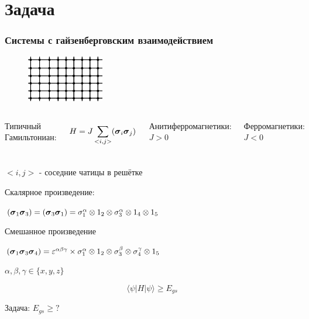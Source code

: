 \documentclass{beamer}
\begin{document}
\section{Задача}
\begin{frame}
\frametitle{Системы с гайзенберговским взаимодействием}
\begin{figure}
\includegraphics[width=0.3\textwidth]{lattice.png}
\end{figure}

\begin{columns}[c] %
\begin{center}Типичный Гамильтониан:\end{center}
$$H=J\sum_{<i,j>}({\boldsymbol{\sigma}}_i {\boldsymbol{\sigma}}_j)$$

Анитиферромагнетики: $J>0$

Ферромагнетики: $J<0$

\end{columns}
$<i,j>$ - соседние чатицы в решётке

Скалярное произведение: 

$({\boldsymbol{\sigma}}_1{\boldsymbol{\sigma}}_3) = ({\boldsymbol{\sigma}}_3{\boldsymbol{\sigma}}_1) = \sigma_1^\alpha\otimes 1_2\otimes\sigma_3^\alpha \otimes 1_4 \otimes 1_5 $%

Смешанное произведение 

$({\boldsymbol{\sigma}}_1{\boldsymbol{\sigma}}_3{\boldsymbol{\sigma}}_4) = 
\varepsilon^{\alpha\beta\gamma} \times \sigma_1^\alpha\otimes 1_2\otimes\sigma_3^\beta\otimes \sigma_4^\gamma \otimes 1_5 $

$\alpha,\beta,\gamma \in \{x,y,z\}$

$$\langle\psi|H|\psi\rangle \geqslant E_{gs}$$

\begin{center}Задача: $E_{gs} \geqslant ?$\end{center}

\end{frame}
\end{document}
